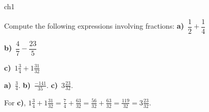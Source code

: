 {\begin{problems}{ch1}
	
	\begin{problem} 
		Compute the following expressions involving fractions:
		\threecol
			\textbf{a)}~$\dfrac{1}{2} + \dfrac{1}{4}$
			
			\textbf{b)}~$\dfrac{4}{7} - \dfrac{23}{5}$
			
			\textbf{c)}~$1\frac{3}{4} + 1\frac{31}{32}$
		\endthreecol
		\begin{answer}\textbf{a)}~$\frac{3}{4}$.
					\textbf{b)}~$\frac{-141}{35}$.
					\textbf{c)}~$3\frac{23}{32}$.\end{answer}
		\begin{solution}
			For \textbf{c)}, 
			$1\frac{3}{4} + 1\frac{31}{32} 
				= \frac{7}{4} + \frac{63}{32} 
				= \frac{56}{32} + \frac{63}{32} = \frac{119}{32}=3\frac{23}{32}$.
		\end{solution}
	\end{problem}

	
\end{problems}


} 



